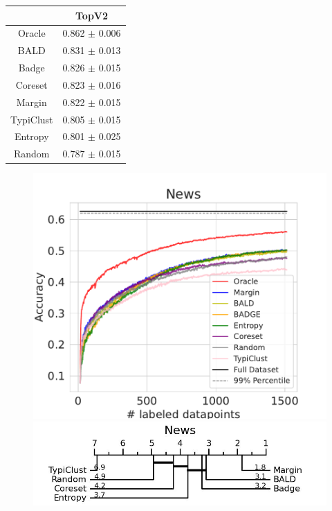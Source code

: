 \documentclass[]{article}
\begin{document}
\begin{minipage}{0.29\linewidth}
\begin{tabular}{c|c}
&TopV2\\
\hline
Oracle&0.862 $\pm$ 0.006\\
BALD&0.831 $\pm$ 0.013\\
Badge&0.826 $\pm$ 0.015\\
Coreset&0.823 $\pm$ 0.016\\
Margin&0.822 $\pm$ 0.015\\
TypiClust&0.805 $\pm$ 0.015\\
Entropy&0.801 $\pm$ 0.025\\
Random&0.787 $\pm$ 0.015\\
\end{tabular}
\end{minipage}
\begin{minipage}{0.65\linewidth}
\begin{figure}[H]
    \centering
\includegraphics[width=\linewidth]{img/eval_news} \\[2mm]
\includegraphics[width=\linewidth]{img/micro_news.jpg}
\end{figure}
\end{minipage}
\end{document}
